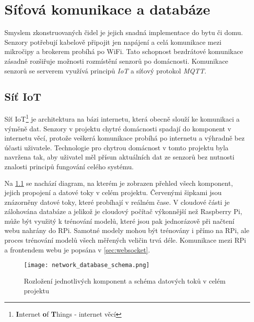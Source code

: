 \chapter{Síťová komunikace a databáze} \label{chap:network_database}
Smyslem zkonstruovaných čidel je jejich snadná implementace do bytu či domu. Senzory potřebují kabelově připojit jen napájení a celá komunikace mezi mikročipy a brokerem probíhá po WiFi. Tato schopnost bezdrátové komunikace zásadně rozšiřuje možnosti rozmístění senzorů po domácnosti. Komunikace senzorů se serverem využívá principů \textit{IoT} a síťový protokol \textit{MQTT}. 

\section*{Síť IoT} \label{sec:iot}
Síť IoT\footnote{\textbf{I}nternet \textbf{o}f \textbf{T}hings - internet věcí} je architektura na bázi internetu, která obecně slouží ke komunikaci a výměně dat. Senzory v projektu chytré domácnosti spadají do komponent v internetu věcí, protože veškerá komunikace probíhá po internetu a výhradně bez účasti uživatele. Technologie pro chytrou domácnost v tomto projektu byla navržena tak, aby uživatel měl přísun aktuálních dat ze senzorů bez nutnosti znalosti principů fungování celého systému. \par
Na \cref{fig:network_database_schema} se nachází diagram, na kterém je zobrazen přehled všech komponent, jejich propojení a datové toky v celém projektu. Červenými šipkami jsou znázorněny datové toky, které probíhají v reálném čase. V cloudové části je zálohována databáze a jelikož je cloudový počítač výkonnější než Raspberry Pi, může být využitý k trénování modelů, které jsou pak jednorázově při načtení webu nahrány do RPi. Samotné modely mohou být trénovány i přímo na RPi, ale proces trénování modelů všech měřených veličin trvá déle. Komunikace mezi RPi a frontendem webu je popsána v \cref{sec:websocket}.

\begin{figure}[H]
  \centering
  \texttt{[image: network\_database\_schema.png]}
  \caption{Rozložení jednotlivých komponent a schéma datových toků v celém projektu}
  \label{fig:network_database_schema}
\end{figure}

